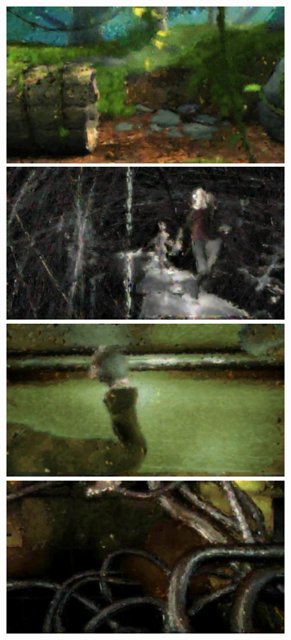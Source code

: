 \begin{figure}
\begin{subfigure}[t]{0.135\textwidth}
		\includegraphics[width=\textwidth]{figures/stereo/bbb_frame-0353-3}\\
		\includegraphics[width=\textwidth]{figures/stereo/ed_frame-0097-3}\\
		\includegraphics[width=\textwidth]{figures/stereo/ed_frame-0438-3}\\
		\includegraphics[width=\textwidth]{figures/stereo/ed_frame-0528-3}

\end{subfigure}
\end{figure}
